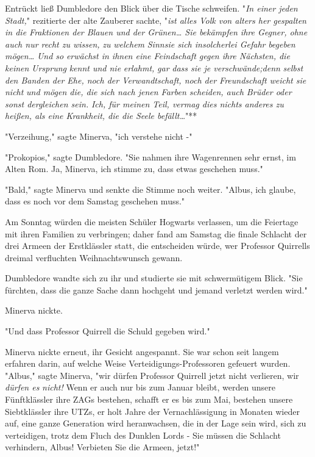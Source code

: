 {Entrückt ließ Dumbledore den Blick über die Tische schweifen. "\emph{In einer jeden Stadt,}" rezitierte der alte Zauberer sachte, "\emph{ist alles Volk von alters her gespalten in die Fraktionen der Blauen und der Grünen… Sie bekämpfen ihre Gegner, ohne auch nur recht zu wissen,} \emph{zu} \emph{welchem} \emph{Sinnsie sich insolcherlei Gefahr} \emph{begeben} \emph{mögen…} \emph{Und so} \emph{erwächst in ihnen eine Feindschaft gegen ihre Nächsten, die keinen} \emph{Ursprung} \emph{kennt und nie} \emph{erlahmt,} \emph{gar} \emph{dass sie je verschwände;denn} \emph{selbst den Banden der Ehe, noch der Verwandtschaft, noch der Freundschaft} \emph{weicht sie nicht} \emph{und mögen die, die sich nach jenen Farben scheiden, auch Brüder oder sonst dergleichen sein.} \emph{Ich, für meinen Teil, vermag dies nichts anderes zu heißen, als eine Krankheit, die die Seele befällt…}"**

"Verzeihung," sagte Minerva, "ich verstehe nicht -"

"Prokopios," sagte Dumbledore. "Sie nahmen ihre Wagenrennen sehr ernst, im Alten Rom. Ja, Minerva, ich stimme zu, dass etwas geschehen muss."

"Bald," sagte Minerva und senkte die Stimme noch weiter. "Albus, ich glaube, dass es noch vor dem Samstag geschehen muss."

Am Sonntag würden die meisten Schüler Hogwarts verlassen, um die Feiertage mit ihren Familien zu verbringen; daher fand am Samstag die finale Schlacht der drei Armeen der Erstklässler statt, die entscheiden würde, wer Professor Quirrells dreimal verfluchten Weihnachtswunsch gewann.

Dumbledore wandte sich zu ihr und studierte sie mit schwermütigem Blick. "Sie fürchten, dass die ganze Sache dann hochgeht und jemand verletzt werden wird."

Minerva nickte.

"Und dass Professor Quirrell die Schuld gegeben wird."

Minerva nickte erneut, ihr Gesicht angespannt. Sie war schon seit langem erfahren darin, auf welche Weise Verteidigungs-Professoren gefeuert wurden. "Albus," sagte Minerva, "wir dürfen Professor Quirrell jetzt nicht verlieren, wir \emph{dürfen es} \emph{nicht!} Wenn er auch nur bis zum Januar bleibt, werden unsere Fünftklässler ihre ZAGs bestehen, schafft er es bis zum Mai, bestehen unsere Siebtklässler ihre UTZs, er holt Jahre der Vernachlässigung in Monaten wieder auf, eine ganze Generation wird heranwachsen, die in der Lage sein wird, sich zu verteidigen, trotz dem Fluch des Dunklen Lords - Sie müssen die Schlacht verhindern, Albus! Verbieten Sie die Armeen, jetzt!"

}
